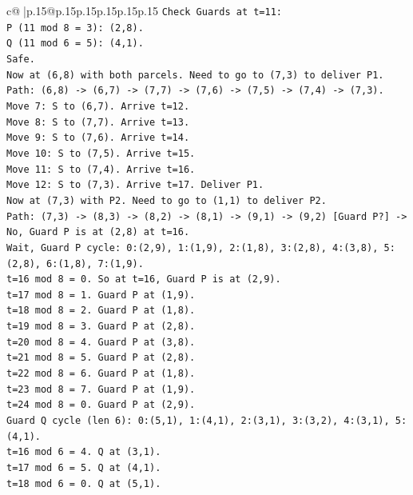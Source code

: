 \documentclass{article}
\begin{document}
{\begin{supertabular}{c@{$\;$}|p{.15\linewidth}@{}p{.15\linewidth}p{.15\linewidth}p{.15\linewidth}p{.15\linewidth}p{.15\linewidth}}
{{{\texttt{Check Guards at t=11:} \\
\texttt{P (11 mod 8 = 3): (2,8).} \\
\texttt{Q (11 mod 6 = 5): (4,1).} \\
\texttt{Safe.} \\
\texttt{Now at (6,8) with both parcels. Need to go to (7,3) to deliver P1.} \\
\texttt{Path: (6,8) {-}> (6,7) {-}> (7,7) {-}> (7,6) {-}> (7,5) {-}> (7,4) {-}> (7,3).} \\
\texttt{Move 7: S to (6,7). Arrive t=12.} \\
\texttt{Move 8: S to (7,7). Arrive t=13.} \\
\texttt{Move 9: S to (7,6). Arrive t=14.} \\
\texttt{Move 10: S to (7,5). Arrive t=15.} \\
\texttt{Move 11: S to (7,4). Arrive t=16.} \\
\texttt{Move 12: S to (7,3). Arrive t=17. Deliver P1.} \\
\texttt{Now at (7,3) with P2. Need to go to (1,1) to deliver P2.} \\
\texttt{Path: (7,3) {-}> (8,3) {-}> (8,2) {-}> (8,1) {-}> (9,1) {-}> (9,2) {[}Guard P?{]} {-}> No, Guard P is at (2,8) at t=16.} \\
\texttt{Wait, Guard P cycle: 0:(2,9), 1:(1,9), 2:(1,8), 3:(2,8), 4:(3,8), 5:(2,8), 6:(1,8), 7:(1,9).} \\
\texttt{t=16 mod 8 = 0. So at t=16, Guard P is at (2,9).} \\
\texttt{t=17 mod 8 = 1. Guard P at (1,9).} \\
\texttt{t=18 mod 8 = 2. Guard P at (1,8).} \\
\texttt{t=19 mod 8 = 3. Guard P at (2,8).} \\
\texttt{t=20 mod 8 = 4. Guard P at (3,8).} \\
\texttt{t=21 mod 8 = 5. Guard P at (2,8).} \\
\texttt{t=22 mod 8 = 6. Guard P at (1,8).} \\
\texttt{t=23 mod 8 = 7. Guard P at (1,9).} \\
\texttt{t=24 mod 8 = 0. Guard P at (2,9).} \\
\texttt{Guard Q cycle (len 6): 0:(5,1), 1:(4,1), 2:(3,1), 3:(3,2), 4:(3,1), 5:(4,1).} \\
\texttt{t=16 mod 6 = 4. Q at (3,1).} \\
\texttt{t=17 mod 6 = 5. Q at (4,1).} \\
\texttt{t=18 mod 6 = 0. Q at (5,1).} \\
}}}
\end{supertabular}}
\end{document}
